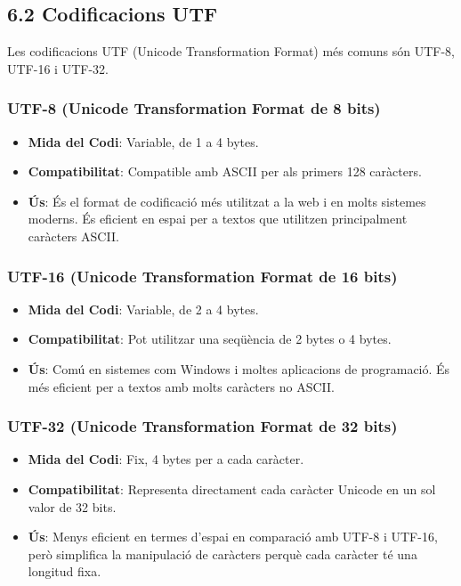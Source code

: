 \documentclass[
  12 pt,
  a4paper,
]{article}
\providecommand{\tightlist}{%
  \setlength{\itemsep}{0pt}\setlength{\parskip}{0pt}}
\begin{document}
\subsection{6.2 Codificacions UTF}\label{codificacions-utf}

Les codificacions UTF (Unicode Transformation Format) més comuns són
UTF-8, UTF-16 i UTF-32.

\subsubsection{UTF-8 (Unicode Transformation Format de 8
bits)}\label{utf-8-unicode-transformation-format-de-8-bits}

\begin{itemize}
\tightlist
\item
  \textbf{Mida del Codi}: Variable, de 1 a 4 bytes.
\item
  \textbf{Compatibilitat}: Compatible amb ASCII per als primers 128
  caràcters.
\item
  \textbf{Ús}: És el format de codificació més utilitzat a la web i en
  molts sistemes moderns. És eficient en espai per a textos que
  utilitzen principalment caràcters ASCII.
\end{itemize}

\subsubsection{UTF-16 (Unicode Transformation Format de 16
bits)}\label{utf-16-unicode-transformation-format-de-16-bits}

\begin{itemize}
\tightlist
\item
  \textbf{Mida del Codi}: Variable, de 2 a 4 bytes.
\item
  \textbf{Compatibilitat}: Pot utilitzar una seqüència de 2 bytes o 4
  bytes.
\item
  \textbf{Ús}: Comú en sistemes com Windows i moltes aplicacions de
  programació. És més eficient per a textos amb molts caràcters no
  ASCII.
\end{itemize}

\subsubsection{UTF-32 (Unicode Transformation Format de 32
bits)}\label{utf-32-unicode-transformation-format-de-32-bits}

\begin{itemize}
\tightlist
\item
  \textbf{Mida del Codi}: Fix, 4 bytes per a cada caràcter.
\item
  \textbf{Compatibilitat}: Representa directament cada caràcter Unicode
  en un sol valor de 32 bits.
\item
  \textbf{Ús}: Menys eficient en termes d'espai en comparació amb UTF-8
  i UTF-16, però simplifica la manipulació de caràcters perquè cada
  caràcter té una longitud fixa.
\end{itemize}
\end{document}
